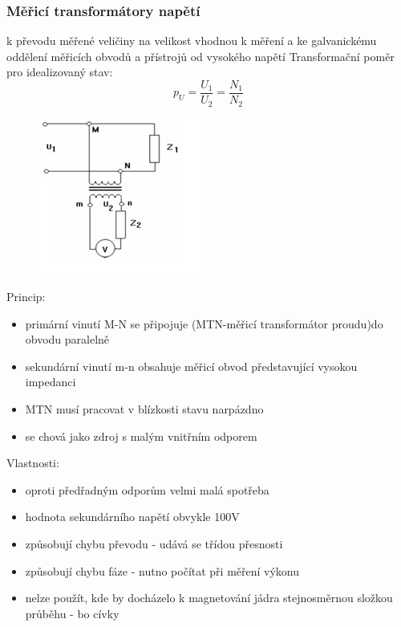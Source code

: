 \subsubsection*{Měřicí transformátory napětí}
k převodu měřené veličiny na velikost vhodnou k měření a ke galvanickému oddělení měřicích obvodů a přístrojů od vysokého napětí 
Transformační poměr pro idealizovaný stav:
\begin{equation}
    p_U = \frac{U_1}{U_2} = \frac{N_1}{N_2}
\end{equation}
\begin{figure}[H]
    \centering
    \includegraphics*[scale = 2]{images/napeti_transformator.png}
\end{figure}
Princip:
\begin{itemize}
    \item primární vinutí M-N se připojuje (MTN-měřicí transformátor proudu)do obvodu paralelně
    \item sekundární vinutí m-n obsahuje měřicí obvod představující vysokou impedanci
    \item MTN musí pracovat v blízkosti stavu narpázdno
    \item se chová jako zdroj s malým vnitřním odporem
\end{itemize}
Vlastnosti:
\begin{itemize}
    \item oproti předřadným odporům velmi malá spotřeba
    \item hodnota sekundárního napětí obvykle 100V
    \item způsobují chybu převodu - udává se třídou přesnosti
    \item způsobují chybu fáze - nutno počítat při měření výkonu
    \item nelze použít, kde by docházelo k magnetování jádra stejnosměrnou složkou průběhu - bo cívky
\end{itemize}
